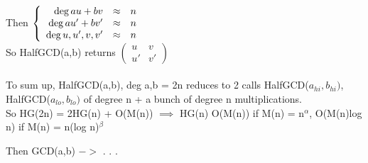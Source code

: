 \documentclass{article}
\theoremstyle{definition}
\theoremstyle{remark}
\begin{document}
Then $\left\{\begin{array}{r c l}
\deg au+bv & \approx & n\\
\deg au'+bv' & \approx & n\\
\deg u,u',v,v' & \approx & n
\end{array}\right .$\\
So HalfGCD(a,b) returns $\begin{pmatrix}
u&v\\u'&v'
\end{pmatrix}$\\\\

To sum up, HalfGCD(a,b), deg a,b = 2n reduces to 2 calls HalfGCD($a_{hi},b_{hi})$, HalfGCD($a_{lo},b_{lo})$ of degree n + a bunch of degree n multiplications.\\
So HG(2n) = 2HG(n) + O(M(n)) $ \implies$ HG(n) O(M(n)) if M(n) = n$^\alpha$, O(M(n)log n) if M(n) = n(log n)$^\beta$

Then GCD(a,b) $->$ . . .
\end{document}
